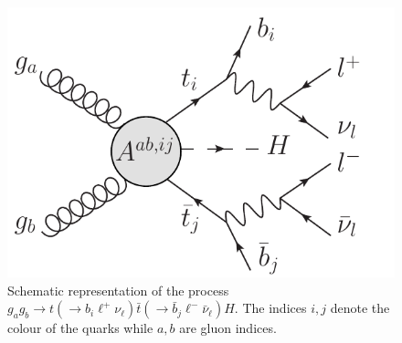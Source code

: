 \documentclass[aps,preprint,tightenlines,floatfix,superscriptaddress,nofootinbib,showpacs]{revtex4-1}
\def\tbar{\bar{t}}
\def\bbar{\bar{b}}
\def\nubar{{\bar{\nu}}_{\ell}}
\begin{document}
\begin{center}
\begin{figure}[th]
\centering
\includegraphics[scale=0.6]{esquematico_II.pdf}
\vspace*{0.02\textwidth}
\caption{Schematic representation of the process $g_ag_b\to t(\to
  b_i{\ell}^+\nu_{\ell})\tbar(\to \bbar_j {\ell}^- \nubar) H$. The
  indices $i,j$ denote the colour of the quarks while $a,b$ are gluon
  indices.}
\label{fig2}
\end{figure}
\end{center}
\end{document}
